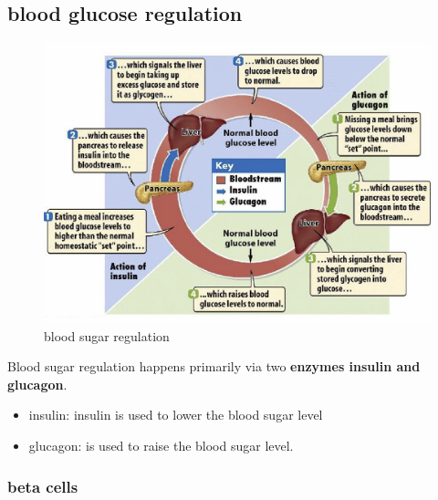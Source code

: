 \documentclass[../main.tex]{subfiles}
\begin{document}
\subsection{blood glucose regulation}
\begin{figure}[H]
    \centering
    \includegraphics[width=0.5\linewidth]{bloodSugarRegulation.png}
    \caption{blood sugar regulation}
    \label{fig:enter-label}
\end{figure}
Blood sugar regulation happens primarily via two \textbf{enzymes insulin and glucagon}. 
\begin{itemize}
    \item insulin: insulin is used to lower the blood sugar level
    \item glucagon: is used to raise the blood sugar level.
\end{itemize}
\subsubsection{beta cells}
\end{document}
